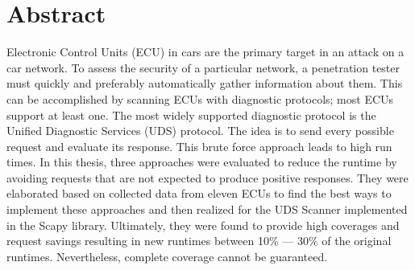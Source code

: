 \chapter*{\centering Abstract}

Electronic Control Units (ECU) in cars are the primary target in an attack on a car network. To assess the security of a particular network, a penetration tester must quickly and preferably automatically gather information about them. This can be accomplished by scanning ECUs with diagnostic protocols; most ECUs support at least one. The most widely supported diagnostic protocol is the Unified Diagnostic Services (UDS) protocol. The idea is to send every possible request and evaluate its response. This brute force approach leads to high run times. In this thesis, three approaches were evaluated to reduce the runtime by avoiding requests that are not expected to produce positive responses. They were elaborated based on collected data from eleven ECUs to find the best ways to implement these approaches and then realized for the UDS Scanner implemented in the Scapy library. Ultimately, they were found to provide high coverages and request savings resulting in new runtimes between 10\% — 30\% of the original runtimes. Nevertheless, complete coverage cannot be guaranteed.
